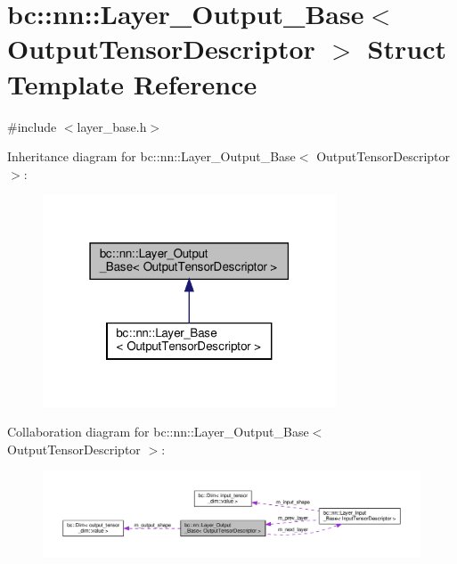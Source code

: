 \hypertarget{structbc_1_1nn_1_1Layer__Output__Base}{}\section{bc\+:\+:nn\+:\+:Layer\+\_\+\+Output\+\_\+\+Base$<$ Output\+Tensor\+Descriptor $>$ Struct Template Reference}
\label{structbc_1_1nn_1_1Layer__Output__Base}


{\ttfamily \#include $<$layer\+\_\+base.\+h$>$}



Inheritance diagram for bc\+:\+:nn\+:\+:Layer\+\_\+\+Output\+\_\+\+Base$<$ Output\+Tensor\+Descriptor $>$\+:\nopagebreak
\begin{figure}[H]
\begin{center}
\leavevmode
\includegraphics[width=247pt]{structbc_1_1nn_1_1Layer__Output__Base__inherit__graph}
\end{center}
\end{figure}


Collaboration diagram for bc\+:\+:nn\+:\+:Layer\+\_\+\+Output\+\_\+\+Base$<$ Output\+Tensor\+Descriptor $>$\+:\nopagebreak
\begin{figure}[H]
\begin{center}
\leavevmode
\includegraphics[width=350pt]{structbc_1_1nn_1_1Layer__Output__Base__coll__graph}
\end{center}
\end{figure}
